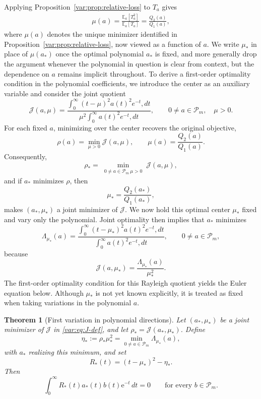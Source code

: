 \documentclass[11pt]{article}
\numberwithin{equation}{section}
\newtheorem{theorem}{Theorem}[section]
\theoremstyle{definition}
\theoremstyle{remark}
\newcommand{\E}{\mathbb E}
\newcommand{\Pcal}{\mathcal P}
\newcommand{\e}{\mathrm e}
\begin{document}
Applying Proposition~\ref{var:prop:relative-loss} to \(T_a\) gives
\begin{align*}
    \mu(a)
    =\frac{\E_a[T_a^2]}{\E_a[T_a]}
    =\frac{Q_2(a)}{Q_1(a)},
\end{align*}
where $\mu(a)$ denotes the unique minimizer identified in Proposition~\ref{var:prop:relative-loss}, now viewed as a function of $a$. We write $\mu_*$ in place of $\mu(a_*)$ once the optimal polynomial $a_*$ is fixed, and more generally drop the argument whenever the polynomial in question is clear from context, but the dependence on $a$ remains implicit throughout.
To derive a first-order optimality condition in the polynomial coefficients, we introduce the center as an auxiliary variable and consider the joint quotient
\begin{equation}\label{var:eq:J-def}
\mathcal J(a,\mu) =
\frac{
\displaystyle\int_0^\infty (t-\mu)^2a(t)^2e^{-t},dt
}{
\displaystyle\mu^2\int_0^\infty a(t)^2e^{-t},dt
},
\qquad
0\ne a\in\Pcal_m,\quad \mu>0.
\end{equation}
For each fixed $a$, minimizing over the center recovers the original objective,
$$
\rho(a)=\min_{\mu>0}\mathcal J(a,\mu),
\qquad
\mu(a)=\frac{Q_2(a)}{Q_1(a)}.
$$
Consequently,
$$
\rho_*
=
\min_{\substack{0\ne a\in\Pcal_m\ \mu>0}}
\mathcal J(a,\mu),
$$
and if $a_*$ minimizes $\rho$, then
$$
\mu_*=\frac{Q_2(a_*)}{Q_1(a_*)},
$$
makes $(a_*,\mu_*)$ a joint minimizer of $\mathcal J$. We now hold this optimal center $\mu_*$ fixed and vary only the polynomial. Joint optimality then implies that $a_*$ minimizes
$$
\Lambda_{\mu_*}(a)
=
\frac{
\displaystyle\int_0^\infty (t-\mu_*)^2a(t)^2e^{-t},dt
}{
\displaystyle\int_0^\infty a(t)^2e^{-t},dt
},
\qquad
0\ne a\in\Pcal_m,
$$
because
$$
\mathcal J(a,\mu_*)=\frac{\Lambda_{\mu_*}(a)}{\mu_*^2}.
$$
The first-order optimality condition for this Rayleigh quotient yields
the Euler equation below. Although $\mu_*$
 is not yet known explicitly, it is treated as fixed when taking variations in the polynomial $a$.



\begin{theorem}[First variation in polynomial directions]\label{var:thm:first-variation}
Let \((a_*,\mu_*)\) be a joint minimizer of \(\mathcal{J}\) in \eqref{var:eq:J-def}, and let \(\rho_*=\mathcal{J}(a_*,\mu_*)\). Define
\begin{equation}\label{var:eq:eta-def}
    \eta_*
    :=\rho_*\mu_*^2
    =\min_{0\ne a\in\Pcal_m}\Lambda_{\mu_*}(a),
\end{equation}
with $a_*$ realizing this minimum, and set
\begin{equation}\label{var:eq:R-def}
    R_*(t)=(t-\mu_*)^2-\eta_*.
\end{equation}
Then
\begin{equation}\label{var:eq:Euler-integral}
    \int_0^\infty R_*(t)a_*(t)b(t)\e^{-t}\,dt=0
    \qquad
    \text{for every }b\in\Pcal_m.
\end{equation}
\end{theorem}
\end{document}
